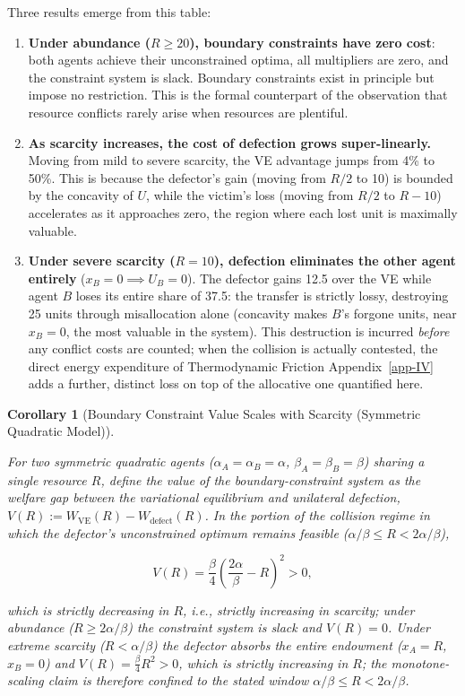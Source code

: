 \documentclass[11pt]{article}
\theoremstyle{plain}
\newtheorem{corollary}[theorem]{Corollary}
\theoremstyle{definition}
\theoremstyle{remark}
\begin{document}
Three results emerge from this table:

\begin{enumerate}
\def\labelenumi{\arabic{enumi}.}
\item
  \textbf{Under abundance (\(R \geq 20\)), boundary constraints have
  zero cost}: both agents achieve their unconstrained optima, all
  multipliers are zero, and the constraint system is slack. Boundary
  constraints exist in principle but impose no restriction. This is the
  formal counterpart of the observation that resource conflicts rarely
  arise when resources are plentiful.
\item
  \textbf{As scarcity increases, the cost of defection grows
  super-linearly.} Moving from mild to severe scarcity, the VE advantage
  jumps from 4\% to 50\%. This is because the defector's gain (moving
  from \(R/2\) to 10) is bounded by the concavity of \(U\), while the
  victim's loss (moving from \(R/2\) to \(R - 10\)) accelerates as it
  approaches zero, the region where each lost unit is maximally
  valuable.
\item
  \textbf{Under severe scarcity (\(R = 10\)), defection eliminates the
  other agent entirely} (\(x_B = 0 \implies U_B = 0\)). The defector
  gains 12.5 over the VE while agent \(B\) loses its entire share of
  37.5: the transfer is strictly lossy, destroying 25 units through
  misallocation alone (concavity makes \(B\)'s forgone units, near
  \(x_B = 0\), the most valuable in the system). This destruction is
  incurred \emph{before} any conflict costs are counted; when the
  collision is actually contested, the direct energy expenditure of
  Thermodynamic Friction Appendix~\ref{app-IV} adds a further, distinct
  loss on top of the allocative one quantified here.
\end{enumerate}

\begin{corollary}[Boundary Constraint Value Scales with Scarcity (Symmetric Quadratic Model)]
\label{cor-constraint-scarcity-scaling}

For two symmetric quadratic agents ($\alpha_A = \alpha_B = \alpha$, $\beta_A = \beta_B = \beta$) sharing a single resource $R$, define the value of the boundary-constraint system as the welfare gap between the variational equilibrium and unilateral defection, $V(R) := W_{\text{VE}}(R) - W_{\text{defect}}(R)$. In the portion of the collision regime in which the defector's unconstrained optimum remains feasible ($\alpha/\beta \leq R < 2\alpha/\beta$),

$$V(R) = \frac{\beta}{4}\left(\frac{2\alpha}{\beta} - R\right)^2 > 0,$$

which is strictly decreasing in $R$, i.e., strictly increasing in scarcity; under abundance ($R \geq 2\alpha/\beta$) the constraint system is slack and $V(R) = 0$. Under extreme scarcity ($R < \alpha/\beta$) the defector absorbs the entire endowment ($x_A = R$, $x_B = 0$) and $V(R) = \frac{\beta}{4} R^2 > 0$, which is strictly \emph{increasing} in $R$; the monotone-scaling claim is therefore confined to the stated window $\alpha/\beta \leq R < 2\alpha/\beta$.
\end{corollary}
\end{document}
